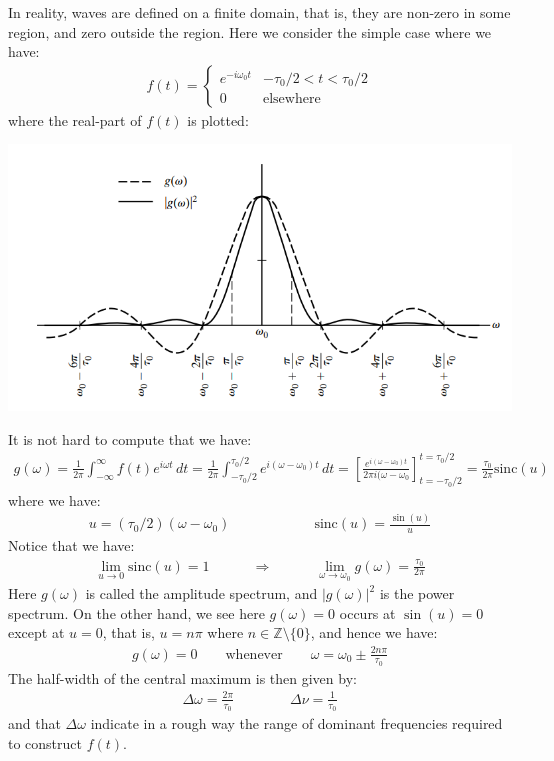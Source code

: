 \documentclass[11pt]{book}
\theoremstyle{break}
\theoremstyle{break}
\newcommand{\Z}{\mathbb{Z}}
\begin{document}
In reality, waves are defined on a finite domain, that is, they are non-zero in some region, and zero outside the region. Here we consider the simple case where we have:
\begin{align*}
f(t) = \begin{cases}
e^{-i\omega_0 t} & -\tau_0/2 < t< \tau_0 /2\\
0 & \text{elsewhere}
\end{cases}
\end{align*}
where the real-part of $f(t)$ is plotted:
\begin{center}
\includegraphics[scale=0.85]{powerSpectrum}
\end{center}
It is not hard to compute that we have:
\begin{align*}
g(\omega) = \frac{1}{2\pi}\int_{-\infty}^\infty f(t) e^{i\omega t}\, dt = \frac{1}{2\pi}\int_{-\tau_0/2}^{\tau_0/2} e^{i(\omega - \omega_0)t}\, dt = \left[ \frac{e^{i(\omega-\omega_0)t}}{2\pi i(\omega-\omega_0}\right]_{t = -\tau_0/2}^{t = \tau_0/2} = \frac{\tau_0}{2\pi}\text{sinc}(u)
\end{align*}
where we have: 
\begin{align*}
u =(\tau_0/2)(\omega-\omega_0)\qquad\qquad\qquad \text{sinc}(u) =  \frac{\sin(u)}{u}
\end{align*}
Notice that we have:
\begin{align*}
\lim_{u\to 0}\text{sinc}(u) = 1 \quad\qquad \Rightarrow \qquad\quad \lim_{\omega \to \omega_0}g(\omega) = \frac{\tau_0}{2\pi}
\end{align*}
Here $g(\omega)$ is called the amplitude spectrum, and $|g(\omega)|^2$ is the power spectrum. On the other hand, we see here $g(\omega)=0$ occurs at $\sin(u)=0$ except at $u=0$, that is, $u = n\pi$ where $n \in \Z \setminus\{0\}$, and hence we have:
\begin{align*}
g(\omega) = 0 \qquad \text{whenever}\qquad \omega = \omega_0 \pm \frac{2n \pi}{\tau_0}
\end{align*}
The half-width of the central maximum is then given by:
\begin{align*}
\Delta \omega = \frac{2\pi}{\tau_0} \qquad\qquad \Delta \nu=\frac{1}{\tau_0}
\end{align*}
and that $\Delta \omega$ indicate in a rough way the range of dominant frequencies required to construct $f(t)$. 
\end{document}
